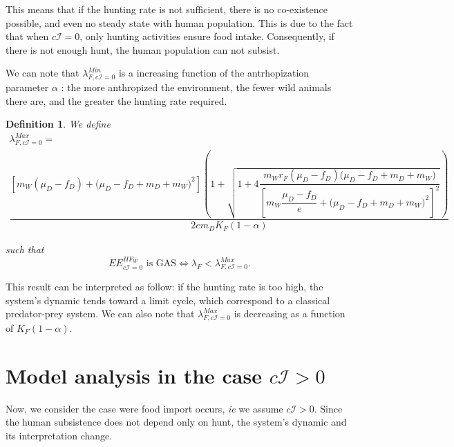 \documentclass{article}
\newcommand{\lfw}{\lambda_{F}}
\newcommand{\lfw}{\lambda_{F}}
\newcommand{\cI}{c \mathcal{I}}
\newtheorem{definition}{Definition}
\begin{document}
This means that if the hunting rate is not sufficient, there is no co-existence possible, and even no steady state with human population. This is due to the fact that when $\cI = 0$, only hunting activities ensure food intake. Consequently, if there is not enough hunt, the human population can not subsist.

We can note that $\lambda_{F, \cI=0}^{Min}$ is a increasing function of the antrhopization parameter $\alpha$ : the more anthropized the environment, the fewer wild animals there are, and the greater the hunting rate required. 

\begin{definition}
We define
\begin{multline*}
\lambda_{F, \cI =0}^{Max}  = \\
 \dfrac{\left[m_{W}(\mu_{D}-f_{D})+\big(\mu_{D}-f_{D}+m_{D}+m_{W})^{2}\right]\left(1+\sqrt{1+4\dfrac{m_{W}r_{F}\left(\mu_{D}-f_{D}\right)\big(\mu_{D}-f_{D}+m_{D}+m_{W})}{\left[m_{W}\dfrac{\mu_{D}-f_{D}}{e}+\big(\mu_{D}-f_{D}+m_{D}+m_{W})^{2}\right]^{2}}}\right)}{2em_D K_F(1- \alpha)}
\end{multline*}

such that $$
\text{$EE^{HF_W}_{c\mathcal{I} = 0}$ is GAS} \Leftrightarrow \lfw < \lambda_{F, \cI =0}^{Max}
.$$
\end{definition}

This result can be interpreted as follow: if the hunting rate is too high, the system's dynamic tends toward a limit cycle, which correspond to a classical predator-prey system. We can also note that $\lambda_{F, \cI =0}^{Max} $ is decreasing as a function of $K_F(1-\alpha)$. 



\section{Model analysis in the case $c\mathcal{I} > 0$}
Now, we consider the case were food import occurs, \textit{ie} we assume $c\mathcal{I} > 0$. Since the human subsistence does not depend only on hunt, the system's dynamic and its interpretation change.
\end{document}

